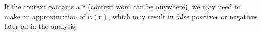 If the context contains a \verb!*! (context word can be anywhere),
we may need to make an approximation of $w(r)$, which may result in false positives or negatives later on in the analysis.










